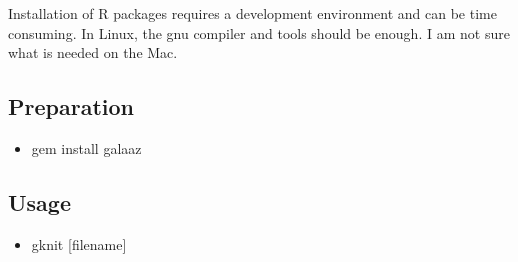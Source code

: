 \documentclass[]{article}
\providecommand{\tightlist}{%
  \setlength{\itemsep}{0pt}\setlength{\parskip}{0pt}}
\begin{document}
Installation of R packages requires a development environment and can be
time consuming. In Linux, the gnu compiler and tools should be enough. I
am not sure what is needed on the Mac.

\subsection{Preparation}\label{preparation}

\begin{itemize}
\tightlist
\item
  gem install galaaz
\end{itemize}

\subsection{Usage}\label{usage}

\begin{itemize}
\tightlist
\item
  gknit {[}filename{]}
\end{itemize}
\end{document}
